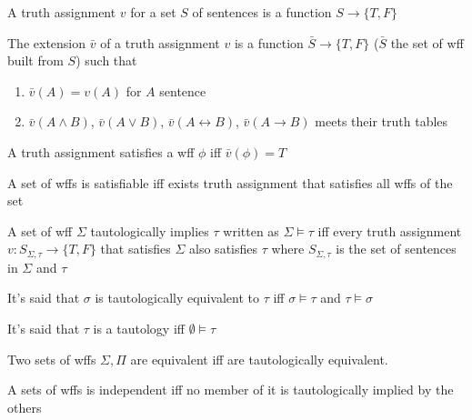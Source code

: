 \documentclass[../../main.tex]{subfiles}
\begin{document}
\begin{definition}
    A truth assignment $v$ for a set $S$ of sentences is a function $S\rightarrow\{T,F\}$
\end{definition}
\begin{definition}
    The extension $\bar{v}$ of a truth assignment $v$ is a function $\bar{S}\rightarrow\{T,F\}$ ($\bar{S}$ the set of wff built from $S$) such that
    \begin{enumerate}
        \item $\bar{v}(A) = v(A)$ for $A$ sentence
        \item $\bar{v}(A\wedge B)$, $\bar{v}(A\vee B)$, $\bar{v}(A\leftrightarrow B)$, $\bar{v}(A\rightarrow B)$ meets their truth tables
    \end{enumerate}
\end{definition}
\begin{definition}
    A truth assignment satisfies a wff $\phi$ iff $\bar{v}(\phi) = T$
\end{definition}
\begin{definition}
    A set of wffs is satisfiable iff exists truth assignment that satisfies all wffs of the set
\end{definition}
\begin{definition}
    A set of wff $\Sigma$ tautologically implies $\tau$ written as $\Sigma\models\tau$ iff every truth assignment $v:S_{\Sigma, \tau} \rightarrow \{T,F\}$ that satisfies $\Sigma$ also satisfies $\tau$ where $S_{\Sigma, \tau}$ is the set of sentences in $\Sigma$ and $\tau$
\end{definition}
\begin{definition}
    It's said that $\sigma$ is tautologically equivalent to $\tau$ iff $\sigma\models\tau$ and $\tau\models\sigma$
\end{definition}
\begin{definition}[Tautology]
    It's said that $\tau$ is a tautology iff $\emptyset\models\tau$
\end{definition}
\begin{definition}
    Two sets of wffs $\Sigma, \Pi$ are equivalent iff are tautologically equivalent.
\end{definition}
\begin{definition}
    A sets of wffs is independent iff no member of it is tautologically implied by the others 
\end{definition}
\end{document}
